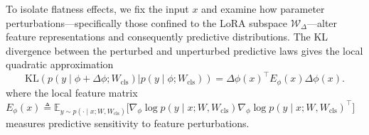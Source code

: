 \documentclass{article} %
\begin{document}


To isolate flatness effects, we fix the input $x$ and examine how parameter perturbations—specifically those confined to the LoRA subspace $\mathcal{W}_\Delta$—alter feature representations and consequently predictive distributions. 
The KL divergence between the perturbed and unperturbed predictive laws gives the local quadratic approximation
\begin{equation}
\label{eq: pro-feature}
 \mathrm{KL}\left(  p(y \mid  \phi + \Delta\phi; W_{\mathrm{cls}})  \Big|  p(y \mid \phi; W_{\mathrm{cls}})  \right)
=
\Delta\phi(x)^\top
 E_\phi(x)
 \Delta\phi(x).
\end{equation}
where the {local feature matrix}
 $
 E_\phi(x)
 \triangleq
 \mathbb{E}_{y \sim p(\cdot \mid x; W, W_{\mathrm{cls}})}
 \Big[
 \nabla_\phi \log p(y \mid x; W, W_{\mathrm{cls}})
 \nabla_\phi \log p(y \mid x; W, W_{\mathrm{cls}})
 ^\top
 \Big]
 $
measures predictive sensitivity to feature perturbations\cite{EFC2024}.


 
\end{document}
